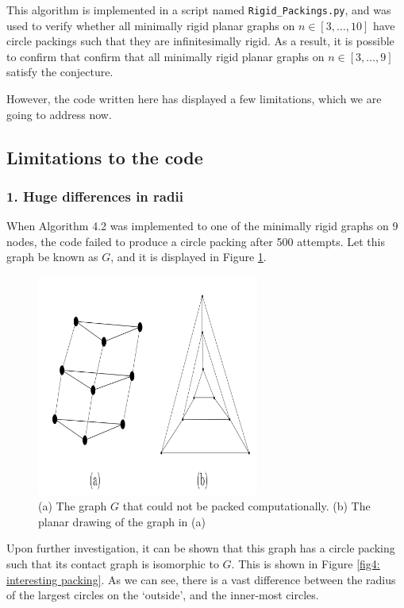 \begin{flushleft}
This algorithm is implemented in a script named \texttt{Rigid\_Packings.py}, and was used to verify whether all minimally rigid planar graphs on $n \in [3, \hdots, 10]$ have circle packings such that they are infinitesimally rigid. As a result, it is possible to confirm that confirm that all minimally rigid planar graphs on $n \in [3, \hdots, 9]$ satisfy the conjecture. 
\end{flushleft}

\begin{flushleft}
However, the code written here has displayed a few limitations, which we are going to address now.
\end{flushleft}

\subsection{Limitations to the code}

\subsubsection{1. Huge differences in radii}

\begin{flushleft}
When Algorithm 4.2 was implemented to one of the minimally rigid graphs on 9 nodes, the code failed to produce a circle packing after 500 attempts. Let this graph be known as $G$, and it is displayed in Figure \ref{fig4: interesting}.
\end{flushleft}

\begin{figure}[htbp]
    \centering
    \includegraphics[width = 0.65\textwidth]{Chapter 4/15. interesting planar.png}
    \caption{(a) The graph $G$ that could not be packed computationally. (b) The planar drawing of the graph in (a)}
    \label{fig4: interesting}
\end{figure}
\vspace{-3mm}
\begin{flushleft}
Upon further investigation, it can be shown that this graph has a circle packing such that its contact graph is isomorphic to $G$. This is shown in Figure \ref{fig4: interesting packing}. As we can see, there is a vast difference between the radius of the largest circles on the `outside', and the inner-most circles. 
\end{flushleft}

